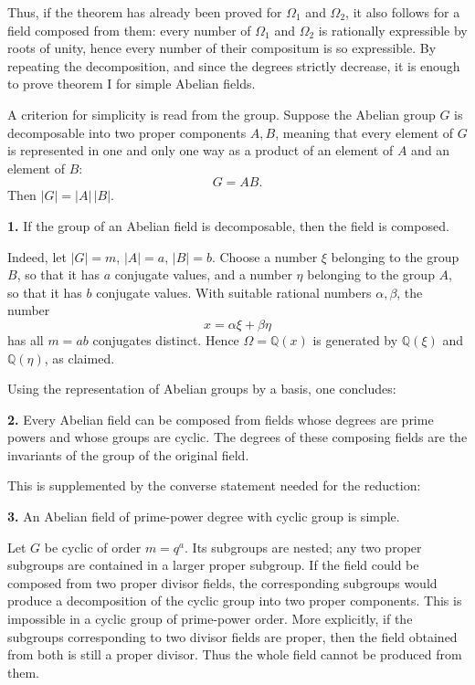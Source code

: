\documentclass[12pt,a4paper]{article}
\begin{document}
Thus, if the theorem has already been proved for \(\Omega_1\) and \(\Omega_2\), it also follows for a field composed from them: every number of \(\Omega_1\) and \(\Omega_2\) is rationally expressible by roots of unity, hence every number of their compositum is so expressible.  By repeating the decomposition, and since the degrees strictly decrease, it is enough to prove theorem I for simple Abelian fields.

A criterion for simplicity is read from the group.  Suppose the Abelian group \(G\) is decomposable into two proper components \(A,B\), meaning that every element of \(G\) is represented in one and only one way as a product of an element of \(A\) and an element of \(B\):
\[
  G=AB.
\tag{2}
\]
Then \(|G|=|A|\,|B|\).

\textbf{1.} If the group of an Abelian field is decomposable, then the field is composed.

Indeed, let \(|G|=m\), \(|A|=a\), \(|B|=b\).  Choose a number \(\xi\) belonging to the group \(B\), so that it has \(a\) conjugate values, and a number \(\eta\) belonging to the group \(A\), so that it has \(b\) conjugate values.  With suitable rational numbers \(\alpha,\beta\), the number
\[
  x=\alpha\xi+\beta\eta
\]
has all \(m=ab\) conjugates distinct.  Hence \(\Omega=\mathbb Q(x)\) is generated by \(\mathbb Q(\xi)\) and \(\mathbb Q(\eta)\), as claimed.

Using the representation of Abelian groups by a basis, one concludes:

\textbf{2.} Every Abelian field can be composed from fields whose degrees are prime powers and whose groups are cyclic.  The degrees of these composing fields are the invariants of the group of the original field.

This is supplemented by the converse statement needed for the reduction:

\textbf{3.} An Abelian field of prime-power degree with cyclic group is simple.

Let \(G\) be cyclic of order \(m=q^a\).  Its subgroups are nested; any two proper subgroups are contained in a larger proper subgroup.  If the field could be composed from two proper divisor fields, the corresponding subgroups would produce a decomposition of the cyclic group into two proper components.  This is impossible in a cyclic group of prime-power order.  More explicitly, if the subgroups corresponding to two divisor fields are proper, then the field obtained from both is still a proper divisor.  Thus the whole field cannot be produced from them.
\end{document}
